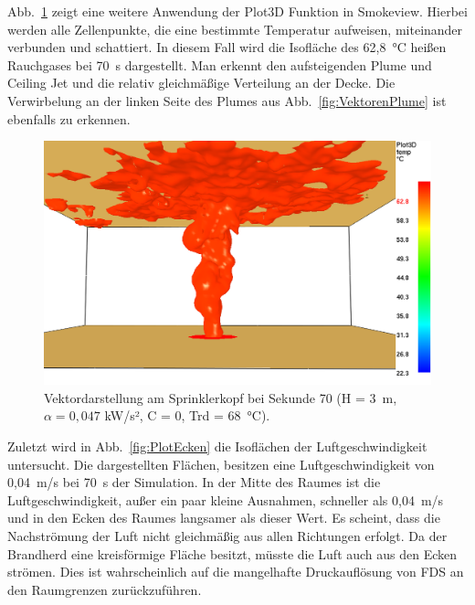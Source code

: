 \clearpage
\SuperPar
Abb.~\ref{fig:PlumeTemp} zeigt eine weitere Anwendung der Plot3D Funktion in Smokeview. Hierbei werden alle Zellenpunkte, die eine bestimmte Temperatur aufweisen, miteinander verbunden und schattiert. In diesem Fall wird die Isofläche des 62,8~°C heißen Rauchgases bei 70~s dargestellt. Man erkennt den aufsteigenden Plume und Ceiling Jet und die relativ gleichmäßige Verteilung an der Decke. Die Verwirbelung an der linken Seite des Plumes aus Abb.~\ref{fig:VektorenPlume} ist ebenfalls zu erkennen.
\begin{figure}[h]
    \centering
    \includegraphics[width=\textwidth]{images/FDSBilder/PlumeTemp.png}
    \caption{Vektordarstellung am Sprinklerkopf bei Sekunde 70 (H = 3~m, $\alpha=0,047$ kW/s², C = 0, Trd = 68~°C).}
    \label{fig:PlumeTemp}
\end{figure}
\clearpage
\SuperPar
Zuletzt wird in Abb.~\ref{fig:PlotEcken} die Isoflächen der Luftgeschwindigkeit untersucht. Die dargestellten Flächen, besitzen eine Luftgeschwindigkeit von 0,04~m/s bei 70~s der Simulation. In der Mitte des Raumes ist die Luftgeschwindigkeit, außer ein paar kleine Ausnahmen, schneller als 0,04~m/s und in den Ecken des Raumes langsamer als dieser Wert. Es scheint, dass die Nachströmung der Luft nicht gleichmäßig aus allen Richtungen erfolgt. Da der Brandherd eine kreisförmige Fläche besitzt, müsste die Luft auch aus den Ecken strömen. Dies ist wahrscheinlich auf die mangelhafte Druckauflösung von FDS an den Raumgrenzen zurückzuführen.

